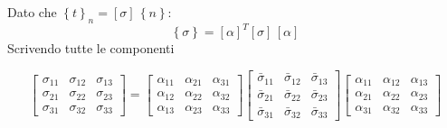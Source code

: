 Dato che $\left\{ t\right\}_n=\left[\sigma\right]\,\left\{n\right\}$:
\begin{equation*}
    \left\{ \sigma\right\}=\left[\alpha\right]^T\left[\sigma\right]\,\left[\alpha\right]
\end{equation*}
Scrivendo tutte le componenti
    
\begin{equation*}
    \begin{bmatrix}
        \sigma_{11} & \sigma_{12} & \sigma_{13} \\
        \sigma_{21} & \sigma_{22} & \sigma_{23} \\
        \sigma_{31} & \sigma_{32} & \sigma_{33}
    \end{bmatrix}
    =
    \begin{bmatrix}
        \alpha_{11} & \alpha_{21} & \alpha_{31} \\
        \alpha_{12} & \alpha_{22} & \alpha_{32} \\
        \alpha_{13} & \alpha_{23} & \alpha_{33}
    \end{bmatrix}
     \begin{bmatrix}
        \bar{\sigma}_{11} & \bar{\sigma}_{12} & \bar{\sigma}_{13} \\
        \bar{\sigma}_{21} & \bar{\sigma}_{22} & \bar{\sigma}_{23} \\
        \bar{\sigma}_{31} & \bar{\sigma}_{32} & \bar{\sigma}_{33}
    \end{bmatrix}
    \begin{bmatrix}
        \alpha_{11} & \alpha_{12} & \alpha_{13} \\
        \alpha_{21} & \alpha_{22} & \alpha_{23} \\
        \alpha_{31} & \alpha_{32} & \alpha_{33}
    \end{bmatrix}
\end{equation*}

